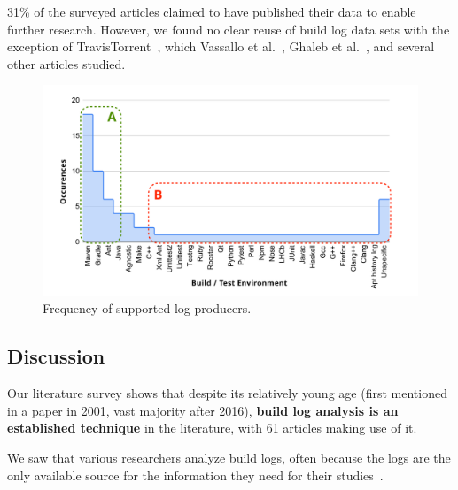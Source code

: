 31\% of the surveyed articles claimed to have published their data to
enable further research.
However, we found no clear reuse of build log data sets with the
exception of TravisTorrent~\cite{beller2017travistorrent}, which
Vassallo et al.~\cite{vassallo2017a-tale},
Ghaleb et al.~\cite{ghaleb2019studying},
and several other articles studied.

\begin{figure}[tbhp]
		\centering
		\includegraphics[width=\columnwidth, trim={1.1cm 0.4cm
		1.5cm 0.5cm},
		clip]{img/lit-sur/log_producer_annotated.pdf}
		\caption{Frequency of supported log producers.}
		\label{fig:litsur:log_producer}
\end{figure}


\subsection{Discussion}
\label{sec:lit-sur:discussion}

Our literature survey shows that despite its relatively young age
(first mentioned in a paper in 2001, vast majority after
2016), \textbf{build log analysis is an established technique}
in the literature, with 61 articles making use of it.



We saw that various researchers analyze build logs, often because the
logs are the only available source for the
information they need for their studies~\cite{ren2018automated,
seo2014programmers,beller2017oops,zampetti2017open,rausch2017empirical}.

